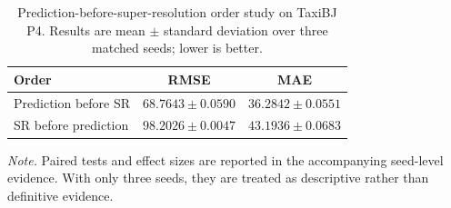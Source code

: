 \begin{table}[htb]
\centering
\caption{Prediction-before-super-resolution order study on TaxiBJ P4. Results are mean $\pm$ standard deviation over three matched seeds; lower is better.}
\label{tab:order-study}
\small
\begin{tabular}{lcc}
\toprule
Order & RMSE & MAE \\
\midrule
Prediction before SR & $68.7643\pm0.0590$ & $36.2842\pm0.0551$ \\
SR before prediction & $98.2026\pm0.0047$ & $43.1936\pm0.0683$ \\
\bottomrule
\end{tabular}
\vspace{2pt}
\parbox{\linewidth}{\footnotesize\textit{Note.} Paired tests and effect sizes are reported in the accompanying seed-level evidence. With only three seeds, they are treated as descriptive rather than definitive evidence.}
\end{table}
